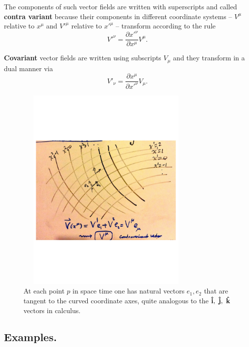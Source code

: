 \documentclass[12pt,reqno]{amsart}
\theoremstyle{definition}
\numberwithin{equation}{section}
\begin{document}
\medskip

The components of such vector fields are written with superscripts and called  {\bf contra variant} because their components in different coordinate systems -- $V^\mu$ relative to $x^\mu$ and $V'^\mu$ relative to $x'^\mu$ -- transform according to the rule 
\begin{equation}\label{contravarianttransf}
V'^\nu = \frac{\partial x'^\nu}{\partial x^\mu} V^\mu.
\end{equation}


{\bf Covariant} vector fields are written using subscripts $V_\mu$ and they transform in a dual manner via 
\begin{equation}\label{covarianttransf}
V'_\nu = \frac{\partial x^\mu}{\partial x'^\nu} V_\mu.
\end{equation}

\vskip-70pt
\begin{figure}[H]
\includegraphics[width=3.5in,height=4in]{curvedcoords.pdf} 
\vskip-70pt
\caption{{\SMALL At each point $p$ in space time one has natural vectors $e_1, e_2$ that are tangent to the curved coordinate axes, quite analogous to the $\bold{\hat i, \ \hat j, \ \hat k}$ vectors in calculus.}}
\end{figure}

\medskip\subsection{ Examples.} 
\end{document}
